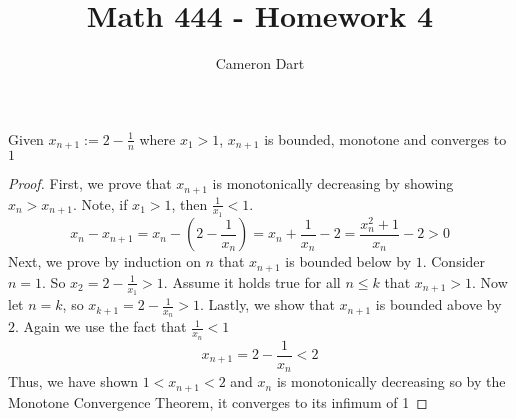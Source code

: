 \documentclass[12pt]{article}
\newenvironment{claim}[2][Claim]{\begin{trivlist}
		\item[\hskip \labelsep {\bfseries #1}\hskip \labelsep {\bfseries #2}]}{\end{trivlist}}
\begin{document}
	\title{Math 444 - Homework 4}
	\author{Cameron Dart}
	\maketitle

\begin{claim}{3.3.2}
	Given $x_{n+1} := 2 - \frac{1}{n} $ where $x_1 > 1$, $x_{n+1}$ is bounded, monotone and converges to $1$ 
\end{claim}

\begin{proof}
		First, we prove that $x_{n+1}$ is monotonically decreasing by showing $x_n > x_{n + 1}$.
		Note, if $x_1 > 1$, then $\frac{1}{x_1} < 1$.
	\begin{equation}
	x_n - x_{n + 1} = x_n - (2 - \frac{1}{x_n}) = x_n + \frac{1}{x_n} - 2 = \frac{x_n^{2} + 1}{x_n} - 2 > 0
	\end{equation}
	Next, we prove by induction on $n$ that $x_{n+1}$ is bounded below by $1$. Consider $n = 1$. So $x_2 = 2 - \frac{1}{x_1} > 1$. Assume it holds true for all $n \leq k$ that $x_{n+1} > 1$. Now let $n = k$, so $x_{k+1} = 2 - \frac{1}{x_n} > 1$.
	Lastly, we show that $x_{n+1}$ is bounded above by $2$. Again we use the fact that $\frac{1}{x_n} < 1$ 
	\begin{equation}
		x_{n + 1} = 2 - \frac{1}{x_n} < 2
	\end{equation}
	Thus, we have shown $1 < x_{n +1} < 2$  and $x_n$ is monotonically decreasing so by the Monotone Convergence Theorem, it converges to its infimum of 1
\end{proof}
\end{document}
